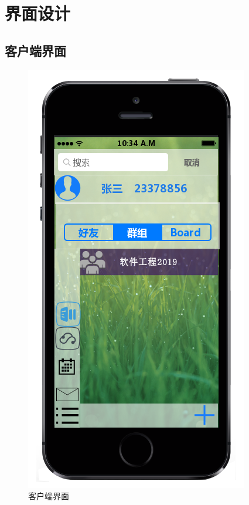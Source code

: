 \chapter{\color{red} 界面设计}
    \section{客户端界面}
    \begin{figure}[h]
        \centering
        \includegraphics[scale=0.6]{OutlineDesign/figures/客户端界面.png}
        \caption{客户端界面}
        \label{fig:server_flow}
    \end{figure}
    \newpage
